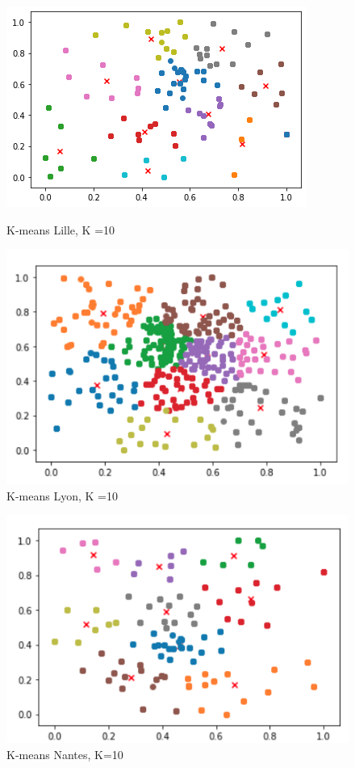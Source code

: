 \documentclass{report}
\begin{document}
  \begin{figure}[H]
    \begin{minipage}{0.4\textwidth}
      \centering
      \includegraphics[scale=0.50]{images/k-means_lille.png}
      \caption{K-means Lille, K =10}\label{Fig:Data1}
    \end{minipage}\hfill
    \begin{minipage}{0.4\textwidth}
      \centering
      \includegraphics[scale=0.40]{images/k-means_lyon.png}
      \caption{K-means Lyon, K =10}\label{Fig:Data2}
    \end{minipage}
  \end{figure}
  \begin{figure}[H]
    \centering
    \includegraphics[scale=0.40]{images/k-means_nantes.png}
    \caption{K-means Nantes, K=10 }
  \end{figure}
\end{document}
